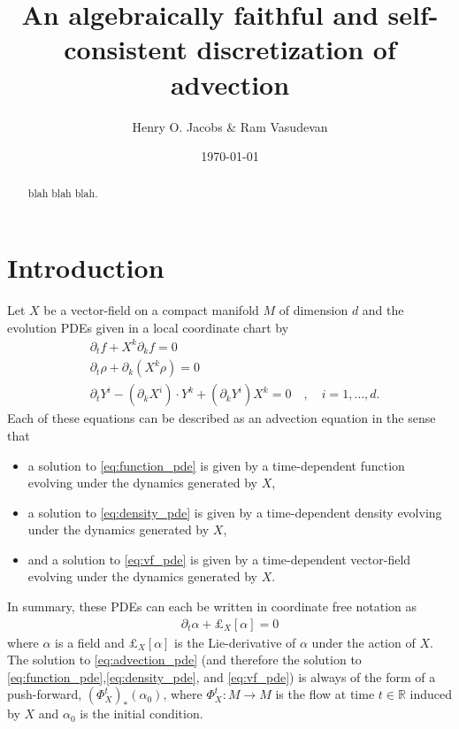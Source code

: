 \documentclass[12pt]{amsart}
\title{An algebraically faithful and self-consistent discretization of advection}
\author{Henry O. Jacobs \& Ram Vasudevan}
\date{\today}
\newcommand{\R}{\ensuremath{\mathbb{R}}}
\begin{document}
\maketitle

\begin{abstract}
  blah blah blah.
\end{abstract}

\section{Introduction}
\label{sec:PDEs}
Let $X$ be a vector-field on a compact manifold $M$ of dimension $d$
and the evolution PDEs given in a local coordinate chart by
\begin{align}
	&\partial_t f + X^k \partial_k f= 0 \label{eq:function_pde} \\
	&\partial_t \rho + \partial_k( X^k \rho) = 0  \label{eq:density_pde} \\
	&\partial_t Y^i - (\partial_k X^i) \cdot Y^k + (\partial_k Y^i) X^k  = 0 \quad , \quad i = 1,\dots,d \label{eq:vf_pde}.
\end{align}
Each of these equations can be described as an advection equation in the sense that
\begin{itemize}
	\item a solution to \eqref{eq:function_pde} is given by a time-dependent function evolving under the dynamics generated by $X$,
	\item a solution to \eqref{eq:density_pde} is given by a time-dependent density evolving under the dynamics generated by $X$,
	\item and a solution to \eqref{eq:vf_pde} is given by a time-dependent vector-field evolving under the dynamics generated by $X$.
\end{itemize}
In summary, these PDEs can each be written in coordinate free notation as
\begin{align}
	\partial_t \alpha + \pounds_{X}[\alpha] = 0 \label{eq:advection_pde}
\end{align}
where $\alpha$ is a field and $\pounds_X[\alpha]$ is the Lie-derivative of $\alpha$ under the action of $X$.
The solution to \eqref{eq:advection_pde} (and therefore the solution to \eqref{eq:function_pde},\eqref{eq:density_pde}, and \eqref{eq:vf_pde}) is always of the form of a push-forward, $(\Phi_{X}^t)_* (\alpha_0)$, where $\Phi_{X}^t : M \to M$ is the flow at time $t \in \R$ induced by $X$ and $\alpha_0$ is the initial condition.
\end{document}
